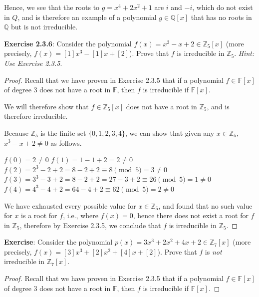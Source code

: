 \documentclass[a4paper]{article}
\begin{document}
\begin{myparindent}{0pt}
Hence, we see that the roots to $g = x^4 + 2x^2 + 1$ are $i$ and $-i$, which
do not exist in $Q$, and is therefore an example of a polynomial
$g \in \mathbb{Q}[x]$ that has no roots in $\mathbb{Q}$ but is not irreducible.
\newline

\textbf{Exercise 2.3.6}:
Consider the polynomial $f(x) = x^3 - x + 2 \in \mathbb{Z}_5[x]$ (more precisely,
$f(x) = [1]x^3 - [1]x + [2]$). Prove that $f$ is irreducible in $\mathbb{Z}_5$.
\textit{Hint: Use Exercise 2.3.5}.
\newline
\begin{proof}
  Recall that we have proven in Exercise 2.3.5 that if a polynomial
  $f \in \mathbb{F}[x]$ of degree 3 does not have a root in $\mathbb{F}$, then
  $f$ is irreducible if $\mathbb{F}[x]$. \newline

  We will therefore show that $f \in \mathbb{Z}_5[x]$ does not have a root in
  $\mathbb{Z}_5$, and is therefore irreducible. \newline

  Because $\mathbb{Z}_5$ is the finite set $\{0, 1, 2, 3, 4\}$, we can show
  that given any $x \in \mathbb{Z}_5$, $x^3 - x + 2 \neq 0$ as follows.
  \newline

  $f(0) = 2 \neq 0$ \newline
  $f(1) = 1 - 1 + 2 = 2 \neq 0$ \newline
  $f(2) = 2^3 - 2 + 2 = 8 - 2 + 2 \equiv 8 \pmod{5} = 3 \neq 0$ \newline
  $f(3) = 3^3 - 3 + 2 = 8 - 2 + 2 = 27 - 3 + 2 \equiv 26 \pmod{5} = 1 \neq 0$ \newline
  $f(4) = 4^3 - 4 + 2 = 64 - 4 + 2 \equiv 62 \pmod{5} = 2 \neq 0$ \newline

  We have exhausted every possible value for $x \in \mathbb{Z}_5$, and found
  that no such value for $x$ is a root for $f$, i.e., where $f(x) = 0$, hence
  there does not exist a root for $f$ in $\mathbb{Z}_5$, therefore by Exercise
  2.3.5, we conclude that $f$ is irreducible in $\mathbb{Z}_5$.
\end{proof}

\textbf{Exercise}:
Consider the polynomial $p(x) = 3x^3 + 2x^2 + 4x + 2 \in \mathbb{Z}_7[x]$
(more precisely, $f(x) = [3]x^3 + [2]x^2 + [4]x + [2]$). Prove that $f$ is
\textit{not} irreducible in $\mathbb{Z}_7[x]$.


\begin{proof}
  Recall that we have proven in Exercise 2.3.5 that if a polynomial
  $f \in \mathbb{F}[x]$ of degree 3 does not have a root in $\mathbb{F}$, then
  $f$ is irreducible if $\mathbb{F}[x]$. \newline


\end{proof}
\end{myparindent}
\end{document}
